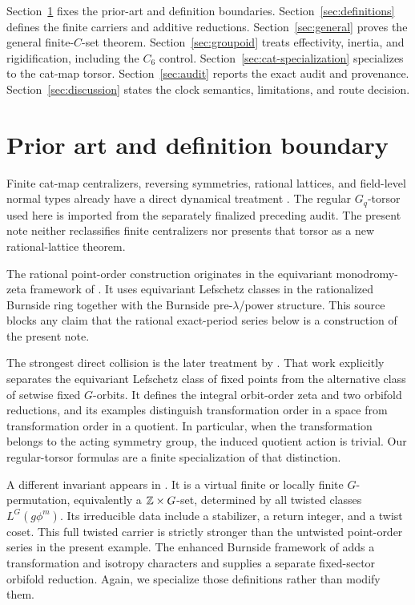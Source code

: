 \documentclass[11pt]{article}
\theoremstyle{definition}
\theoremstyle{remark}
\begin{document}
Section~\ref{sec:prior} fixes the prior-art and definition boundaries.
Section~\ref{sec:definitions} defines the finite carriers and additive
reductions.  Section~\ref{sec:general} proves the general finite-\(C\)-set
theorem.  Section~\ref{sec:groupoid} treats effectivity, inertia, and
rigidification, including the \(C_6\) control.
Section~\ref{sec:cat-specialization} specializes to the cat-map torsor.
Section~\ref{sec:audit} reports the exact audit and provenance.
Section~\ref{sec:discussion} states the clock semantics, limitations, and
route decision.

\section{Prior art and definition boundary}
\label{sec:prior}

Finite cat-map centralizers, reversing symmetries, rational lattices, and
field-level normal types already have a direct dynamical treatment
\citep{BaakeNeumaerkerRoberts2013}.  The regular \(G_q\)-torsor used here is
imported from the separately finalized preceding audit.  The present note neither
reclassifies finite centralizers nor presents that torsor as a new
rational-lattice theorem.

The rational point-order construction originates in the equivariant
monodromy-zeta framework of
\citet{GuseinZadeLuengoMelle2008}.  It uses equivariant Lefschetz classes in
the rationalized Burnside ring together with the Burnside
pre-\(\lambda\)/power structure.  This source blocks any claim that the
rational exact-period series below is a construction of the present note.

The strongest direct collision is the later treatment by
\citet{GuseinZadeLuengoMelle2015}.  That work explicitly separates the
equivariant Lefschetz class of fixed points from the alternative class of
setwise fixed \(G\)-orbits.  It defines the integral orbit-order zeta and two
orbifold reductions, and its examples distinguish transformation order in a
space from transformation order in a quotient.  In particular, when the
transformation belongs to the acting symmetry group, the induced quotient
action is trivial.  Our regular-torsor formulas are a finite specialization
of that distinction.

A different invariant appears in \citet{GuseinZade2013}.  It is a virtual
finite or locally finite \(G\)-permutation, equivalently a
\(\mathbb{Z}\times G\)-set, determined by all twisted classes \(L^G(g\phi^m)\).
Its irreducible data include a stabilizer, a return integer, and a twist
coset.  This full twisted carrier is strictly stronger than the untwisted
point-order series in the present example.  The enhanced Burnside framework
of \citet{EbelingGuseinZade2018} adds a transformation and isotropy
characters and supplies a separate fixed-sector orbifold reduction.  Again,
we specialize those definitions rather than modify them.
\end{document}
